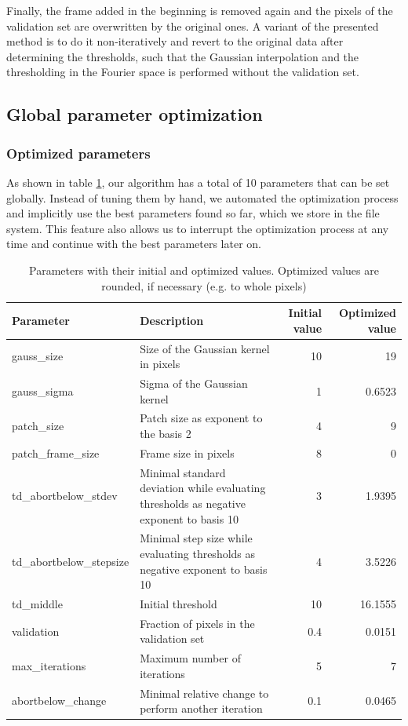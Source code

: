 \documentclass[10pt,conference,compsocconf]{IEEEtran}
\begin{document}
Finally, the frame added in the beginning is removed again and the pixels of the validation set are overwritten by the original ones. A variant of the presented method is to do it non-iteratively and revert to the original data after determining the thresholds, such that the Gaussian interpolation and the thresholding in the Fourier space is performed without the validation set.

\subsection{Global parameter optimization}
\subsubsection{Optimized parameters}
As shown in table \ref{parameters}, our algorithm has a total of 10 parameters that can be set globally. Instead of tuning them by hand, we automated the optimization process and implicitly use the best parameters found so far, which we store in the file system. This feature also allows us to interrupt the optimization process at any time and continue with the best parameters later on.

\begin{table}
\begin{center}
\begin{tabular}{|l|p{6cm}|r|r|}
\hline
Parameter & Description & Initial value & Optimized value\\
\hline
gauss\_size & Size of the Gaussian kernel in pixels & 10 & 19 \\
gauss\_sigma & Sigma of the Gaussian kernel & 1 & 0.6523 \\
patch\_size & Patch size as exponent to the basis 2 & 4 & 9 \\
patch\_frame\_size & Frame size in pixels & 8 & 0 \\
td\_abortbelow\_stdev & Minimal standard deviation while evaluating thresholds as negative exponent to basis 10& 3 & 1.9395 \\
td\_abortbelow\_stepsize & Minimal step size while evaluating thresholds as negative exponent to basis 10& 4 & 3.5226 \\
td\_middle & Initial threshold & 10 & 16.1555 \\
validation & Fraction of pixels in the validation set & 0.4 & 0.0151 \\
max\_iterations & Maximum number of iterations & 5 & 7 \\
abortbelow\_change & Minimal relative change to perform another iteration & 0.1 & 0.0465 \\
\hline
\end{tabular}
\end{center}
\caption{Parameters with their initial and optimized values. Optimized values are rounded, if necessary (e.g. to whole pixels)}
\label{parameters}
\end{table}
\end{document}
